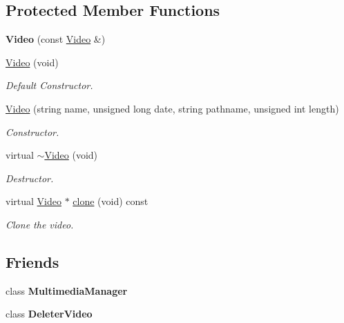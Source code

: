 \subsection*{Protected Member Functions}
\begin{DoxyCompactItemize}
\item 
\hypertarget{class_video_a77b13b3504ce1250d9d85988738d1ed3}{{\bfseries Video} (const \hyperlink{class_video}{Video} \&)}\label{class_video_a77b13b3504ce1250d9d85988738d1ed3}

\item 
\hyperlink{class_video_a0e0e31382d40c5f80e68d8441872eb56}{Video} (void)
\begin{DoxyCompactList}\small\item\em Default Constructor. \end{DoxyCompactList}\item 
\hyperlink{class_video_a11c9bacf664b637c4e3a214054df0ecf}{Video} (string name, unsigned long date, string pathname, unsigned int length)
\begin{DoxyCompactList}\small\item\em Constructor. \end{DoxyCompactList}\item 
virtual \hyperlink{class_video_a887b39f51487f64733e9541838118cf3}{$\sim$\-Video} (void)
\begin{DoxyCompactList}\small\item\em Destructor. \end{DoxyCompactList}\item 
virtual \hyperlink{class_video}{Video} $\ast$ \hyperlink{class_video_a450def61b99cd5c338b83cbfa136c25a}{clone} (void) const 
\begin{DoxyCompactList}\small\item\em Clone the video. \end{DoxyCompactList}\end{DoxyCompactItemize}
\subsection*{Friends}
\begin{DoxyCompactItemize}
\item 
\hypertarget{class_video_a29a97f20d6ded769adf9ecc47158e24f}{class {\bfseries Multimedia\-Manager}}\label{class_video_a29a97f20d6ded769adf9ecc47158e24f}

\item 
\hypertarget{class_video_ae6b99bde93d4652991dcd292ac9dcbd8}{class {\bfseries Deleter\-Video}}\label{class_video_ae6b99bde93d4652991dcd292ac9dcbd8}

\end{DoxyCompactItemize}


